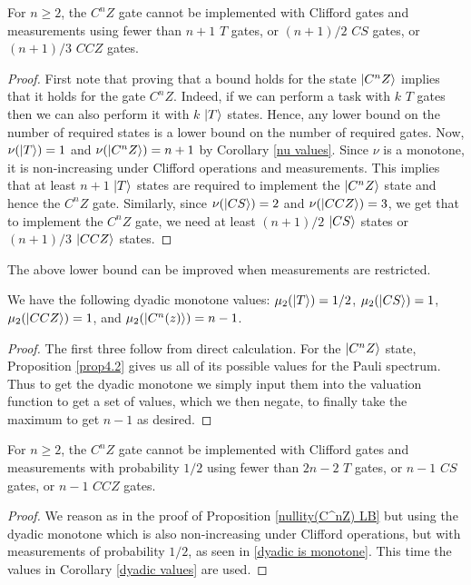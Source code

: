 \documentclass[12pt]{dalthesis}
\begin{document}
\begin{proposition}
\label{nullity(C^nZ) LB}
For $n \geq 2$, the $C^n Z$ gate cannot be implemented with Clifford gates and measurements using fewer than $n+1$ $T$ gates, or $(n+1)/2$ $CS$ gates, or $(n+1)/3$ $CCZ$ gates.
\end{proposition}

\begin{proof}
First note that proving that a bound holds for the state $\ket{C^n Z}$ implies that it holds for the gate $C^n Z$. Indeed, if we can perform a task with $k$ $T$ gates then we can also perform it with $k$ $\ket{T}$ states. Hence, any lower bound on the number of required states is a lower bound on the number of required gates. Now, $\nu (\ket{T}) = 1$ and $\nu (\ket{C^n Z}) = n+1$ by Corollary \ref{nu values}. Since $\nu$ is a monotone, it is non-increasing under Clifford operations and measurements. This implies that at least $n+1$ $\ket{T}$ states are required to implement the $\ket{C^n Z}$ state and hence the $C^n Z$ gate. Similarly, since $\nu (\ket{CS}) = 2$ and $\nu (\ket{CCZ}) = 3$, we get that to implement the $C^n Z$ gate, we need at least $(n+1)/2$ $\ket{CS}$ states or $(n+1)/3$ $\ket{CCZ}$ states.
\end{proof}

The above lower bound can be improved when measurements are restricted.

\begin{corollary}
\label{dyadic values}
We have the following dyadic monotone values: $\mu_2 (\ket{T}) = 1/2$, $\mu_2 (\ket{CS}) = 1$, $\mu_2 (\ket{CCZ}) = 1$, and $\mu_2 (\ket{C^n(z)}) = n-1$.
\end{corollary}
\begin{proof}
The first three follow from direct calculation. For the $\ket{C^nZ}$ state, Proposition \ref{prop4.2} gives us all of its possible values for the Pauli spectrum. Thus to get the dyadic monotone we simply input them into the valuation function to get a set of values, which we then negate, to finally take the maximum to get $n-1$ as desired.
\end{proof}

\begin{lemma}
\label{CCZ lowerbound}
For $n \geq 2$, the $C^n Z$ gate cannot be implemented with Clifford gates and measurements with probability $1/2$ using fewer than $2n-2$ $T$ gates, or $n-1$ $CS$ gates, or $n-1$ $CCZ$ gates.
\end{lemma}
\begin{proof}
We reason as in the proof of Proposition \ref{nullity(C^nZ) LB} but using the dyadic monotone which is also non-increasing under Clifford operations, but with measurements of probability $1/2$, as seen in \ref{dyadic is monotone}. This time the values in Corollary \ref{dyadic values} are used.
\end{proof}
\end{document}
